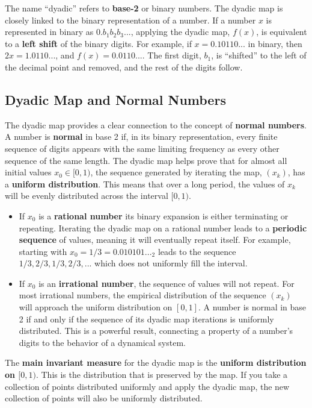 \documentclass[12pt,a4paper]{article}
\begin{document}
The name ``dyadic'' refers to \textbf{base-2} or binary numbers. The dyadic map is closely linked to the binary representation of a number. If a number $x$ is represented in binary as $0.b_1b_2b_3...$, applying the dyadic map, $f(x)$, is equivalent to a \textbf{left shift} of the binary digits. For example, if $x = 0.10110...$ in binary, then $2x = 1.0110...$, and $f(x) = 0.0110...$. The first digit, $b_1$, is ``shifted'' to the left of the decimal point and removed, and the rest of the digits follow.

\subsection{Dyadic Map and Normal Numbers}

The dyadic map provides a clear connection to the concept of \textbf{normal numbers}. A number is \textbf{normal} in base 2 if, in its binary representation, every finite sequence of digits appears with the same limiting frequency as every other sequence of the same length. The dyadic map helps prove that for almost all initial values $x_0 \in [0, 1)$, the sequence generated by iterating the map, $(x_k)$, has a \textbf{uniform distribution}. This means that over a long period, the values of $x_k$ will be evenly distributed across the interval $[0, 1)$.

\begin{itemize}
    \item If $x_0$ is a \textbf{rational number} 
    its binary expansion is either terminating or repeating. Iterating the dyadic map on a rational number leads to a \textbf{periodic sequence} of values, meaning it will eventually repeat itself. For example, starting with $x_0 = 1/3 = 0.010101..._2$ leads to the sequence $1/3, 2/3, 1/3, 2/3, ...$ which does not uniformly fill the interval.
    \item If $x_0$ is an \textbf{irrational number}, the sequence of values will not repeat. For most irrational numbers, the empirical distribution of the sequence $(x_k)$ will approach the uniform distribution on $[0,1]$. A number is normal in base 2 if and only if the sequence of its dyadic map iterations is uniformly distributed. This is a powerful result, connecting a property of a number's digits to the behavior of a dynamical system.
\end{itemize}

The \textbf{main invariant measure} for the dyadic map is the \textbf{uniform distribution on $[0, 1)$}. This is the distribution that is preserved by the map. If you take a collection of points distributed uniformly and apply the dyadic map, the new collection of points will also be uniformly distributed.
\end{document}
